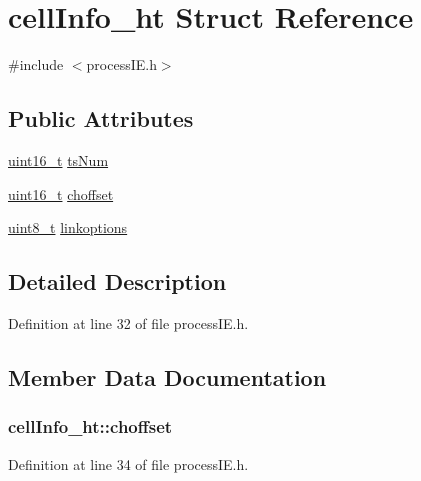 \hypertarget{structcell_info__ht}{}\section{cell\+Info\+\_\+ht Struct Reference}
\label{structcell_info__ht}


{\ttfamily \#include $<$process\+I\+E.\+h$>$}

\subsection*{Public Attributes}
\begin{DoxyCompactItemize}
\item 
\hyperlink{_p_e___types_8h_a1f1825b69244eb3ad2c7165ddc99c956}{uint16\+\_\+t} \hyperlink{structcell_info__ht_ad66acb072768400ef35d293a4c887d3d}{ts\+Num}
\item 
\hyperlink{_p_e___types_8h_a1f1825b69244eb3ad2c7165ddc99c956}{uint16\+\_\+t} \hyperlink{structcell_info__ht_a2a4a2c8f97233a31d8e5eeefc5ee106d}{choffset}
\item 
\hyperlink{_p_e___types_8h_aba7bc1797add20fe3efdf37ced1182c5}{uint8\+\_\+t} \hyperlink{structcell_info__ht_a964b11e7bb93170b463d82ad7b79e1ee}{linkoptions}
\end{DoxyCompactItemize}


\subsection{Detailed Description}


Definition at line 32 of file process\+I\+E.\+h.



\subsection{Member Data Documentation}
\subsubsection[{\texorpdfstring{choffset}{choffset}}]{ cell\+Info\+\_\+ht\+::choffset}\hypertarget{structcell_info__ht_a2a4a2c8f97233a31d8e5eeefc5ee106d}{}\label{structcell_info__ht_a2a4a2c8f97233a31d8e5eeefc5ee106d}


Definition at line 34 of file process\+I\+E.\+h.

